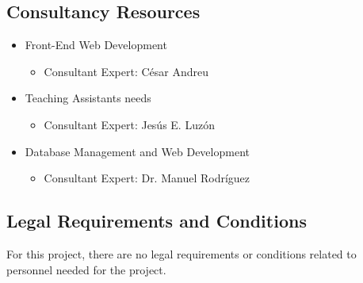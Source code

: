 \subsection{Consultancy Resources}
\begin{itemize}
\item Front-End Web Development
\begin{itemize}
\item Consultant Expert: César Andreu
\end{itemize}
\item Teaching Assistants needs
\begin{itemize}
\item Consultant Expert: Jesús E. Luzón
\end{itemize}
\item Database Management and Web Development
\begin{itemize}
\item Consultant Expert: Dr. Manuel Rodríguez
\end{itemize}
\end{itemize}

\subsection{Legal Requirements and Conditions}

For this project, there are no legal requirements or conditions related to
personnel needed for the project.
